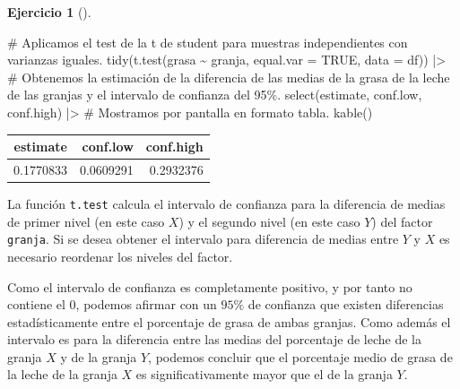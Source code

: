 \documentclass[
  a4paper,
]{scrreport}
\newenvironment{Shaded}{\begin{snugshade}}{\end{snugshade}}
\newcommand{\AttributeTok}[1]{\textcolor[rgb]{0.40,0.45,0.13}{#1}}
\newcommand{\CommentTok}[1]{\textcolor[rgb]{0.37,0.37,0.37}{#1}}
\newcommand{\ConstantTok}[1]{\textcolor[rgb]{0.56,0.35,0.01}{#1}}
\newcommand{\FunctionTok}[1]{\textcolor[rgb]{0.28,0.35,0.67}{#1}}
\newcommand{\NormalTok}[1]{\textcolor[rgb]{0.00,0.23,0.31}{#1}}
\newcommand{\SpecialCharTok}[1]{\textcolor[rgb]{0.37,0.37,0.37}{#1}}
\theoremstyle{definition}
\newtheorem{exercise}{Ejercicio}[chapter]
\theoremstyle{remark}
\begin{document}
\begin{exercise}[]
\begin{enumerate}
\begin{tcolorbox}
\begin{Shaded}
\begin{Highlighting}[]
\CommentTok{\# Aplicamos el test de la t de student para muestras independientes con varianzas iguales.}
\FunctionTok{tidy}\NormalTok{(}\FunctionTok{t.test}\NormalTok{(grasa }\SpecialCharTok{\textasciitilde{}}\NormalTok{ granja, }\AttributeTok{equal.var =} \ConstantTok{TRUE}\NormalTok{, }\AttributeTok{data =}\NormalTok{ df)) }\SpecialCharTok{|\textgreater{}} 
\CommentTok{\# Obtenemos la estimación de la diferencia de las medias de la grasa de la leche de las granjas y el intervalo de confianza del 95\%.}
    \FunctionTok{select}\NormalTok{(estimate, conf.low, conf.high) }\SpecialCharTok{|\textgreater{}} 
    \CommentTok{\# Mostramos por pantalla en formato tabla.}
    \FunctionTok{kable}\NormalTok{()}
\end{Highlighting}
\end{Shaded}

  \begin{tabular}{r|r|r}
  \hline
  estimate & conf.low & conf.high\\
  \hline
  0.1770833 & 0.0609291 & 0.2932376\\
  \hline
  \end{tabular}

  \begin{tcolorbox}[enhanced jigsaw, coltitle=black, left=2mm, colback=white, leftrule=.75mm, toptitle=1mm, breakable, bottomrule=.15mm, titlerule=0mm, bottomtitle=1mm, title=\textcolor{quarto-callout-warning-color}{\faExclamationTriangle}\hspace{0.5em}{Advertencia}, arc=.35mm, toprule=.15mm, rightrule=.15mm, colframe=quarto-callout-warning-color-frame, opacityback=0, colbacktitle=quarto-callout-warning-color!10!white, opacitybacktitle=0.6]

  La función \texttt{t.test} calcula el intervalo de confianza para la
  diferencia de medias de primer nivel (en este caso \(X\)) y el segundo
  nivel (en este caso \(Y\)) del factor \texttt{granja}. Si se desea
  obtener el intervalo para diferencia de medias entre \(Y\) y \(X\) es
  necesario reordenar los niveles del factor.

  \end{tcolorbox}

  Como el intervalo de confianza es completamente positivo, y por tanto
  no contiene el \(0\), podemos afirmar con un \(95\%\) de confianza que
  existen diferencias estadísticamente entre el porcentaje de grasa de
  ambas granjas. Como además el intervalo es para la diferencia entre
  las medias del porcentaje de leche de la granja \(X\) y de la granja
  \(Y\), podemos concluir que el porcentaje medio de grasa de la leche
  de la granja \(X\) es significativamente mayor que el de la granja
  \(Y\).

  \end{tcolorbox}
\end{enumerate}

\end{exercise}
\end{document}
